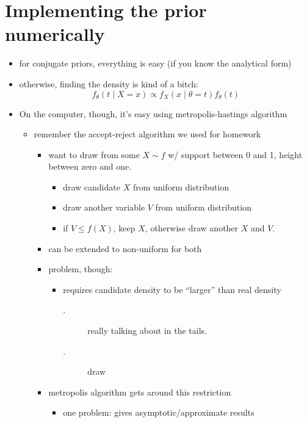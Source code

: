 \section{Implementing the prior numerically}

\begin{itemize}[leftmargin=0pt]
\item for conjugate priors, everything is easy (if you know the analytical form)
\item otherwise, finding the density is kind of a bitch:
  \[f_\theta(t \mid X = x) \propto f_X(x \mid \theta = t) f_\theta(t)\]
\item On the computer, though, it's easy using metropolis-hastings algorithm
\begin{itemize}
\item remember the accept-reject algorithm we used for homework
\begin{itemize}
\item want to draw from some $X \sim f$ w/ support between 0 and 1,
         height between zero and one.
\begin{itemize}
\item draw candidate $X$ from uniform distribution
\item draw another variable $V$ from uniform distribution
\item if $V \leq f(X)$, keep $X$, otherwise draw another $X$ and $V$.
\end{itemize}
\item can be extended to non-uniform for both
\item problem, though:
\begin{itemize}
\item requires candidate density to be ``larger'' than real density
\begin{description}
\item[.] really talking about in the tails.
\item[.] draw
\end{description}
\end{itemize}
\item metropolis algorithm gets around this restriction
\begin{itemize}
\item one problem: gives asymptotic/approximate results
\end{itemize}
\end{itemize}
\end{itemize}
\end{itemize}

